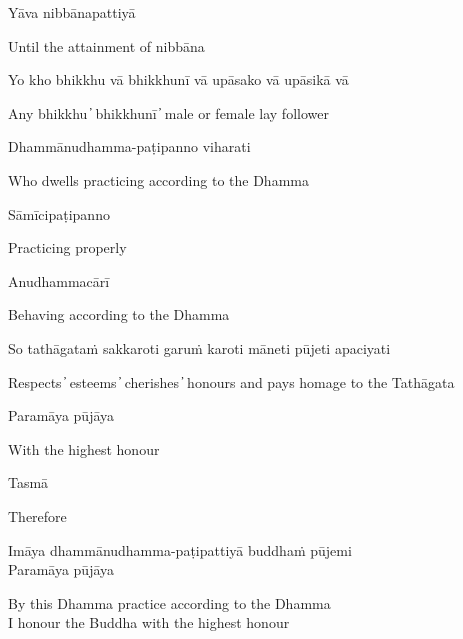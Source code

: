 Yāva nibbānapattiyā

\begin{cprenglish}
Until the attainment of nibbāna
\end{cprenglish}


Yo kho bhikkhu vā bhikkhunī vā upāsako vā upāsikā vā

\begin{cprenglish}
Any bhikkhu  ̓  bhikkhunī  ̓  male or female lay follower
\end{cprenglish}

Dhammānudhamma-paṭipanno viharati

\begin{cprenglish}
Who dwells practicing according to the Dhamma
\end{cprenglish}

Sāmīcipaṭipanno

\begin{cprenglish}
Practicing properly
\end{cprenglish}

Anudhammacārī

\begin{cprenglish}
Behaving according to the Dhamma
\end{cprenglish}

So tathāgataṁ sakkaroti garuṁ karoti māneti pūjeti apaciyati

\begin{cprenglish}
Respects  ̓  esteems  ̓  cherishes  ̓  honours and pays homage to the Tathāgata
\end{cprenglish}

Paramāya pūjāya

\begin{cprenglish}
With the highest honour
\end{cprenglish}


Tasmā

\begin{cprenglish}
Therefore
\end{cprenglish}

Imāya dhammānudhamma-paṭipattiyā buddhaṁ pūjemi\\
Paramāya pūjāya

\begin{cprenglish}
By this Dhamma practice according to the Dhamma\\
I honour the Buddha with the highest honour
\end{cprenglish}

